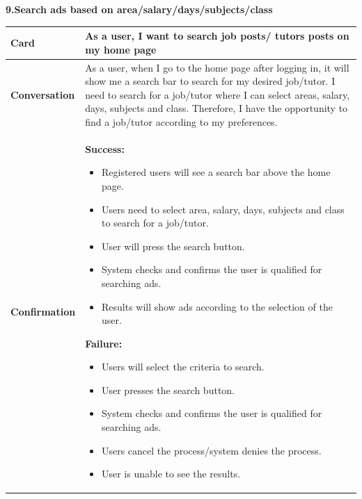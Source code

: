 \textbf{9.Search ads based on area/salary/days/subjects/class}
\begin{center}
\setlength{\tabcolsep}{0.8cm}
\renewcommand{\arraystretch}{1.2}
        \centering
        \begin{longtable}{|m{70pt}|p{9cm}|}
            \hline
                \textbf{Card} &
                 As a user, I want to search job posts/ tutors posts on my home page\\
            \hline
                \textbf{Conversation} &
                     As a user, when I go to the home page after logging in, it will show me a search bar to search for my desired job/tutor. I need to search for a job/tutor where I can select areas, salary, days, subjects and class. Therefore, I have the opportunity to find a job/tutor according to my preferences. \\
            \hline
                \textbf{Confirmation} &
                     \textbf{ Success:}
                        \begin{itemize}
                            \item Registered users will see a search bar above the home page.
                            \item Users need to select area, salary, days, subjects and class to search for a job/tutor.
                            \item User will press the search button.
                            \item System checks and confirms the user is qualified for searching ads.
                            \item Results will show ads according to the selection of the user.
                        \end{itemize}
                    \textbf{Failure:}
                        \begin{itemize}
                            \item Users will select the criteria to search.
                            \item User presses the search button.
                            \item System checks and confirms the user is qualified for searching ads.
                            \item Users cancel the process/system denies the process.
                            \item User is unable to see the results.

\end{itemize}
\end{longtable}
\end{center}
